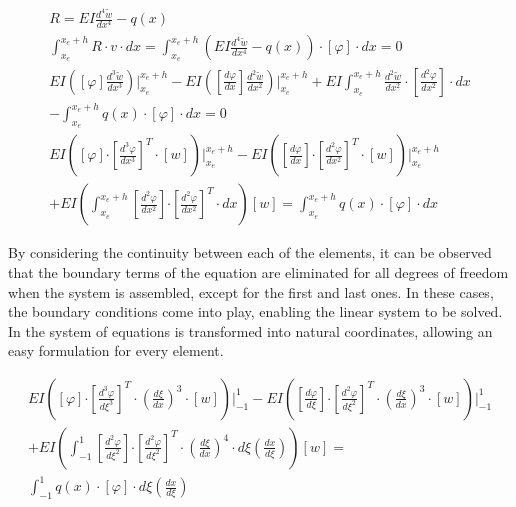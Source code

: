 \documentclass{article}
\begin{document}
\begin{equation}\label{eq:GM_beam}
    \begin{gathered}
        R=EI\frac{d^4\widetilde{w}}{dx^4}-q\left(x\right)\\
        \int_{x_e}^{x_e+h}{R\cdot v\cdot d x}=\int_{x_e}^{x_e+h}{\left(EI\frac{d^4\widetilde{w}}{dx^4}-q\left(x\right)\right)\cdot\left[\varphi\right]\cdot dx}=0\\
        EI\left(\left[\varphi\right]\frac{d^3\widetilde{w}}{dx^3}\right)\Bigg\rvert_{x_e}^{x_e+h}-EI\left(\left[\frac{d\varphi}{dx}\right]\frac{d^2\widetilde{w}}{dx^2}\right)\Bigg\rvert_{x_e}^{x_e+h}+EI\int_{x_e}^{x_e+h}{\frac{d^2\widetilde{w}}{dx^2}\cdot\left[\frac{d^2\varphi}{dx^2}\right]\cdot d x}\\-\int_{x_e}^{x_e+h}{q\left(x\right)\cdot\left[\varphi\right]\cdot d x}=0\\
        EI\left(\left[\varphi\right]{\cdot\left[\frac{d^3\varphi}{dx^3}\right]}^T\cdot\left[w\right]\right)\Bigg\rvert_{x_e}^{x_e+h}-EI\left(\left[\frac{d\varphi}{dx}\right]{\cdot\left[\frac{d^2\varphi}{dx^2}\right]}^T\cdot\left[w\right]\right)\Bigg\rvert_{x_e}^{x_e+h}\\+EI\left(\int_{x_e}^{x_e+h}{\left[\frac{d^2\varphi}{dx^2}\right]{\cdot\left[\frac{d^2\varphi}{dx^2}\right]}^T\cdot d x}\right)\left[w\right]=\int_{x_e}^{x_e+h}{q\left(x\right)\cdot\left[\varphi\right]\cdot d x}
    \end{gathered}
\end{equation}

\vspace{2ex}

By considering the continuity between each of the elements, it can be observed that the boundary terms of the equation are eliminated for all degrees of freedom when the system is assembled, except for the first and last ones. In these cases, the boundary conditions come into play, enabling the linear system to be solved. In the system of equations is transformed into natural coordinates, allowing an easy formulation for every element.


\begin{equation}\label{eq:GM_beam_local}
    \begin{gathered}
        EI\left(\left[\varphi\right]{\cdot\left[\frac{d^3\varphi}{d\xi^3}\right]}^T\cdot\left(\frac{d\xi}{dx}\right)^3\cdot\left[w\right]\right)\Bigg\rvert_{-1}^{1}-EI\left(\left[\frac{d\varphi}{d\xi}\right]{\cdot\left[\frac{d^2\varphi}{d\xi^2}\right]}^T\cdot\left(\frac{d\xi}{dx}\right)^3\cdot\left[w\right]\right)\Bigg\rvert_{-1}^{1}\\
        +EI\left(\int_{-1}^{1}{\left[\frac{d^2\varphi}{d\xi^2}\right]{\cdot\left[\frac{d^2\varphi}{d\xi^2}\right]}^T\cdot\left(\frac{d\xi}{dx}\right)^4\cdot d\xi\left(\frac{dx}{d\xi}\right)}\right)\left[w\right]=\\\int_{-1}^{1}{q\left(x\right)\cdot\left[\varphi\right]\cdot d\xi\left(\frac{dx}{d\xi}\right)}
    \end{gathered}
\end{equation}
\end{document}
